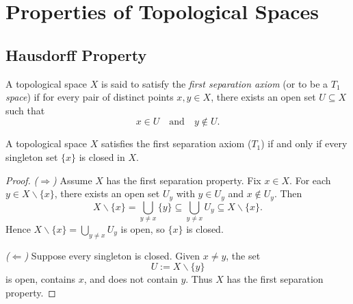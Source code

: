 \chapter{Properties of Topological Spaces}

\section{Hausdorff Property}

\begin{definition}
A topological space \(X\) is said to satisfy the \emph{first separation axiom} (or to be a \emph{\(T_1\) space}) if for every pair of distinct points \(x,y \in X\), there exists an open set \(U \subseteq X\) such that
\[
x \in U \quad \text{and} \quad y \notin U.
\]
\end{definition}

\begin{proposition}
A topological space \(X\) satisfies the first separation axiom (\(T_1\)) if and only if every singleton set \(\{x\}\) is closed in \(X\).
\end{proposition}

\begin{proof}
\emph{(\(\Rightarrow\))} Assume \(X\) has the first separation property. Fix \(x \in X\). For each \(y \in X \smallsetminus \{x\}\), there exists an open set \(U_y\) with \(y \in U_y\) and \(x \notin U_y\). Then
\[
X \smallsetminus \{x\}
= \bigcup_{y \neq x} \{y\}
\subseteq \bigcup_{y \neq x} U_y
\subseteq X \smallsetminus \{x\}.
\]
Hence \(X \smallsetminus \{x\} = \bigcup_{y \neq x} U_y\) is open, so \(\{x\}\) is closed.

\emph{(\(\Leftarrow\))} Suppose every singleton is closed. Given \(x \neq y\), the set
\[
U := X \smallsetminus \{y\}
\]
is open, contains \(x\), and does not contain \(y\). Thus \(X\) has the first separation property.
\end{proof}


